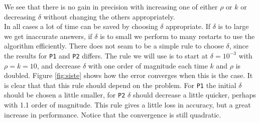 We see that there is no gain in precision with increasing one of either $\rho$ or $k$ or decreasing $\delta$ without changing the others appropriately. \\

In all cases a lot of time can be saved by choosing $\delta$ appropriate. If $\delta$ is to large we get inaccurate answers, if $\delta$ is to small we perform to many restarts to use the algorithm efficiently. There does not seam to be a simple rule to choose $\delta$, since the results for \texttt{P1} and \texttt{P2} differs. The rule we will use is to start at $\delta=10^{-3}$ with $\rho = k = 10$, and decrease $\delta$ with one order of magnitude each time $k$ and $\rho$ is doubled. %
Figure \ref{fig:siste} shows how the error converges when this is the case. It is clear that that this rule should depend on the problem. For \texttt{P1}  the initial $\delta$ should be chosen a little smaller, for \texttt{P2} $\delta$ should decrease a little quicker, perhaps with 1.1 order of magnitude. This rule gives a little loss in accuracy, but a great increase in performance. Notice that the convergence is still quadratic.

